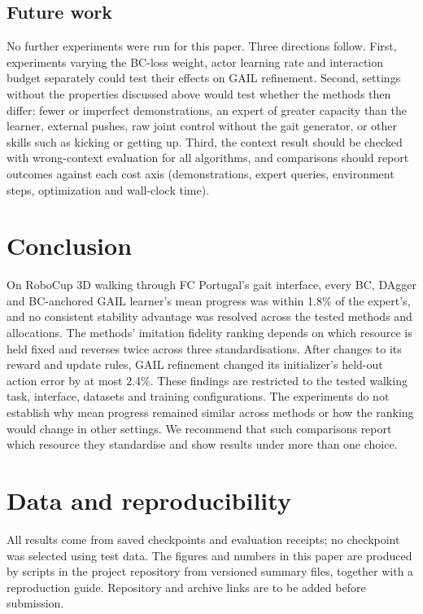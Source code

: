 \documentclass[conference]{IEEEtran}
\begin{document}
\subsection{Future work}
No further experiments were run for this paper. Three directions follow. First, experiments varying the BC-loss weight, actor learning rate and interaction budget separately could test their effects on GAIL refinement. Second, settings without the properties discussed above would test whether the methods then differ: fewer or imperfect demonstrations, an expert of greater capacity than the learner, external pushes, raw joint control without the gait generator, or other skills such as kicking or getting up. Third, the context result should be checked with wrong-context evaluation for all algorithms, and comparisons should report outcomes against each cost axis (demonstrations, expert queries, environment steps, optimization and wall-clock time).

\section{Conclusion}
On RoboCup 3D walking through FC Portugal's gait interface, every BC, DAgger and BC-anchored GAIL learner's mean progress was within 1.8\% of the expert's, and no consistent stability advantage was resolved across the tested methods and allocations. The methods' imitation fidelity ranking depends on which resource is held fixed and reverses twice across three standardisations. After changes to its reward and update rules, GAIL refinement changed its initializer's held-out action error by at most 2.4\%. These findings are restricted to the tested walking task, interface, datasets and training configurations. The experiments do not establish why mean progress remained similar across methods or how the ranking would change in other settings. We recommend that such comparisons report which resource they standardise and show results under more than one choice.

\section*{Data and reproducibility}
All results come from saved checkpoints and evaluation receipts; no checkpoint was selected using test data. The figures and numbers in this paper are produced by scripts in the project repository from versioned summary files, together with a reproduction guide. Repository and archive links are to be added before submission.

\label{bodyend}
\clearpage


\end{document}
